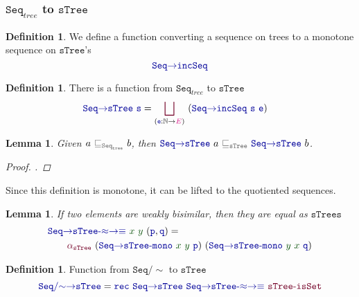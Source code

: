 \documentclass[twoside,11pt,openright]{report}
\theoremstyle{plain} %
\newtheorem{lem}[thm]{Lemma}
\theoremstyle{definition}
\newtheorem{defn}[thm]{Definition}%
\theoremstyle{remark}
\newcommand*{\term}[1]{\textcolor{green!30!black}{#1}} %
\newcommand*{\type}[1]{\textcolor{magenta!90!black}{#1}}
\newcommand*{\relation}[1]{\textcolor{gray!75!black}{\ensuremath{\mathtt{#1}}}}
\newcommand*{\function}[1]{\textcolor{blue!60!black}{\ensuremath{\mathtt{#1}}}}
\newcommand*{\constructor}[1]{\textcolor{purple!60!black}{\ensuremath{\mathtt{#1}}}}
\newcommand*{\typeformer}[1]{\ensuremath{\mathtt{#1}}}
\begin{document}
\subsubsection{\(\typeformer{Seq}_{tree}\) to \(\typeformer{sTree}\)}
\begin{defn}
  We define a function converting a sequence on trees to a monotone sequence on \typeformer{sTree}'s
  \begin{equation}
    \function{Seq{\rightarrow}incSeq}
  \end{equation}
\end{defn}
\begin{defn}
  There is a function from \(\typeformer{Seq}_{tree}\) to \(\typeformer{sTree}\)
  \begin{equation}
    \begin{aligned}
      &\function{Seq{\rightarrow}sTree}~\function{s} = \mathop{\constructor{\bigsqcup}}_{(\function{e} : \mathbb{N} \rightarrow \type{E})}~(\function{Seq{\rightarrow}incSeq}~\function{s}~\function{e})
    \end{aligned}
  \end{equation}
\end{defn}
\begin{lem}
  Given \(a~\relation{\sqsubseteq_{\typeformer{Seq}_{tree}}}~b\), then \(\function{Seq{\rightarrow}sTree}~a~\relation{\sqsubseteq_{sTree}}~\function{Seq{\rightarrow}sTree}~b\).
  \begin{proof}
    .
  \end{proof}
\end{lem}
\noindent Since this definition is monotone, it can be lifted to the quotiented sequences.
\begin{lem}
  If two elements are weakly bisimilar, then they are equal as \function{sTrees} 
  \begin{equation}
    \begin{aligned}
      &\function{Seq{\rightarrow}sTree\text{-}{\approx}{\rightarrow}{\equiv}}~\term{x}~\term{y}~(\function{p},\function{q}) = \\
      &\qquad\constructor{\alpha_{sTree}}~(\function{Seq{\rightarrow}sTree\text{-}mono}~\term{x}~\term{y}~\function{p})~(\function{Seq{\rightarrow}sTree\text{-}mono}~\term{y}~\term{x}~\function{q})
    \end{aligned}
  \end{equation}
\end{lem}
\begin{defn}
  Function from \(\typeformer{Seq/{\sim}}\) to \(\typeformer{sTree}\)
  \begin{equation}
    \function{Seq/{\sim}{\rightarrow}sTree} = \function{rec}~\function{Seq{\rightarrow}sTree}~\function{Seq{\rightarrow}sTree\text{-}{\approx}{\rightarrow}{\equiv}}~\constructor{sTree\text{-}isSet}
  \end{equation}
\end{defn}
\end{document}
